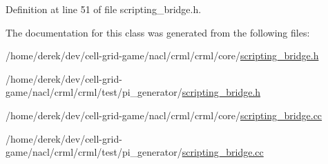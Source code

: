 Definition at line 51 of file scripting\_\-bridge.h.



The documentation for this class was generated from the following files:\begin{DoxyCompactItemize}
\item 
/home/derek/dev/cell-\/grid-\/game/nacl/crml/crml/core/\hyperlink{core_2scripting__bridge_8h}{scripting\_\-bridge.h}\item 
/home/derek/dev/cell-\/grid-\/game/nacl/crml/crml/test/pi\_\-generator/\hyperlink{test_2pi__generator_2scripting__bridge_8h}{scripting\_\-bridge.h}\item 
/home/derek/dev/cell-\/grid-\/game/nacl/crml/crml/core/\hyperlink{core_2scripting__bridge_8cc}{scripting\_\-bridge.cc}\item 
/home/derek/dev/cell-\/grid-\/game/nacl/crml/crml/test/pi\_\-generator/\hyperlink{test_2pi__generator_2scripting__bridge_8cc}{scripting\_\-bridge.cc}\end{DoxyCompactItemize}
